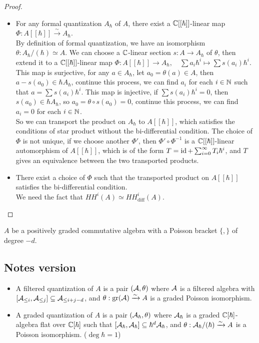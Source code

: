 \begin{proof}
  \begin{itemize}
    \item[Step 1:] For any formal quantization $A_{\hbar}$ of $A$, there exist a $\mathbb{C}[[\hbar]]$-linear map $\Phi: A[[\hbar]] \xrightarrow{\sim} A_{\hbar} $.\\
    By definition of formal quantization, we have an isomorphism $\theta: A_{\hbar}/(\hbar) \simeq A$. We can choose a $\mathbb{C}$-linear section $s: A \to A_{\hbar}$ of $\theta$, then extend it to a $\mathbb{C}[[\hbar]]$-linear map $\Phi: A[[\hbar]] \to A_{\hbar}, \quad \sum a_i \hbar^i \mapsto \sum s(a_i) \hbar^i$. This map is surjective, for any $a \in A_{\hbar}$, let $a_0 = \theta(a) \in A $, then $a - s(a_0) \in \hbar A_{\hbar}$, continue this process, we can find $a_i$ for each $i \in \mathbb{N}$ such that $a = \sum s(a_i)\hbar^i$. This map is injective, if $\sum s(a_i) \hbar^i = 0$, then $s(a_0) \in \hbar A_{\hbar}$, so $a_0 = \theta \circ s(a_0) = 0$, continue this process, we can find $a_i = 0$ for each $i \in \mathbb{N}$.\\
    So we can transport the product on $A_{\hbar}$ to $A[[\hbar]]$, which satisfies the conditions of star product without the bi-differential condition. 
    The choice of $\Phi$ is not unique, if we choose another $\Phi'$, then $\Phi' \circ \Phi^{-1}$ is a $\mathbb{C}[[\hbar]]$-linear automorphism of $A[[\hbar]]$, which is of the form $T = \operatorname{id} + \sum_{i=0}^{\infty} T_i \hbar^i$, and $T$ gives an equivalence between the two transported products.

    \item[Step 2:]  There exist a choice of $\Phi$ such that the transported product on $A[[\hbar]]$ satisfies the bi-differential condition.\\
    We need the fact that $HH^i(A) \simeq HH^i_{\mathrm{diff}}(A)$.
  \end{itemize}
\end{proof}



$A$ be a positively graded commutative algebra with a Poisson bracket $\{,\}$ of degree $-d$.

\subsection{Notes version}
\cite{Losev2022Topics}

\begin{itemize}
  \item A filtered quantization of $A$ is a pair $(\mathcal{A},\theta)$ where $\mathcal{A}$ is a filtered algebra with $[\mathcal{A}_{\leq i},\mathcal{A}_{\leq j}] \subseteq \mathcal{A}_{\leq i+j-d}$, and $\theta: \operatorname{gr}(\mathcal{A}) \xrightarrow{\sim} A$ is a graded Poisson isomorphism.
  \item A graded quantization of $A$ is a pair $(\mathcal{A}_{\hbar},\theta)$ where $\mathcal{A}_{\hbar}$ is a graded $\mathbb{C}[\hbar]$-algebra flat over $\mathbb{C}[\hbar]$ such that $[\mathcal{A}_{\hbar},\mathcal{A}_{\hbar}] \subseteq \hbar^{d}\mathcal{A}_{\hbar}$, and $\theta: \mathcal{A}_{\hbar}/(\hbar) \xrightarrow{\sim} A$ is a Poisson isomorphism.
  ($\deg \hbar = 1$)
\end{itemize}

